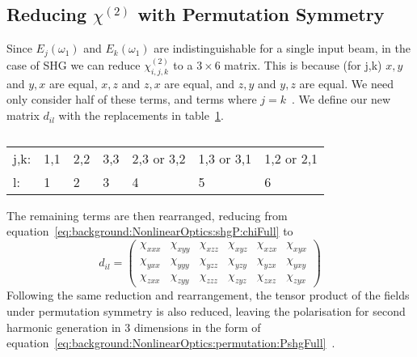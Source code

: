 \subsection{Reducing \texorpdfstring{$\chi^{(2)}$}{Lg} with Permutation Symmetry}\label{sec:background:NonlinearOptics:permutation}
Since $E_{j}(\omega_{1} )$ and $E_{k}(\omega_{1} )$ are indistinguishable for a single input beam, in the case of SHG we can reduce $\chi^{(2)}_{i, j, k}$ to a $3\times6$ matrix. This is because (for j,k) $x,y$ and $y,x$ are equal, $x,z$ and $z,x$ are equal, and $z,y$ and $y,z$ are equal. We need only consider half of these terms, and terms where $j=k$~\cite[\S 1.5.2]{Boyd2008a}. We define our new matrix $d_{il}$ with the replacements in table~\ref{table:jkl}.

\begin{table}[H]
\centering
\caption{}
\begin{tabular}{lllllll}
j,k: & 1,1 & 2,2 & 3,3 & 2,3 or 3,2 & 1,3 or 3,1 & 1,2 or 2,1 \\
l:   & 1   & 2   & 3   & 4          & 5          & 6          
\end{tabular}
\label{table:jkl}
\end{table}
The remaining terms are then rearranged, reducing from equation~\ref{eq:background:NonlinearOptics:shgP:chiFull} to
\begin{equation}\label{eq:background:NonlinearOptics:permutation:dil}
	d_{il}=
	\begin{pmatrix}
		\chi_{xxx} & \chi_{xyy} & \chi_{xzz} & \chi_{xyz} & \chi_{xzx} & \chi_{xyx}\\ 
		\chi_{yxx} & \chi_{yyy} & \chi_{yzz} & \chi_{yzy} & \chi_{yzx} & \chi_{yxy}\\ 
		\chi_{zxx} & \chi_{zyy} & \chi_{zzz} & \chi_{zyz} & \chi_{zxz} & \chi_{zyx}
	\end{pmatrix}
\end{equation}
Following the same reduction and rearrangement, the tensor product of the fields under permutation symmetry is also reduced, leaving the polarisation for second harmonic generation in 3 dimensions in the form of equation~\ref{eq:background:NonlinearOptics:permutation:PshgFull}~\cite[\S 38.3]{Tang1995}.
